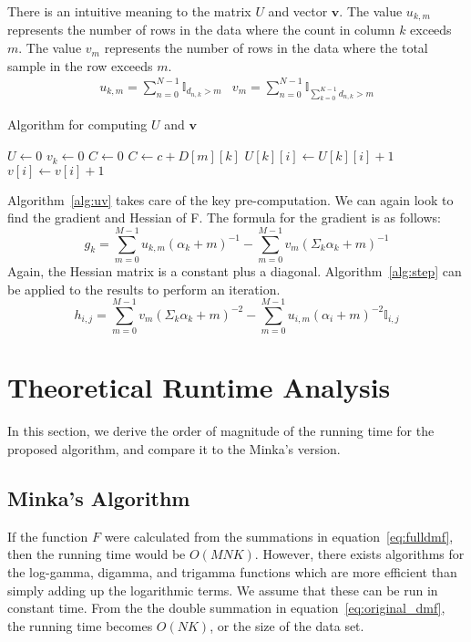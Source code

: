 \documentclass[twoside]{article}
\begin{document}
There is an intuitive meaning to the matrix $U$ and vector $\mathbf{v}$.  The value $u_{k,m}$ represents the number of rows in the data where the count in column $k$ exceeds $m$.  The value $v_m$ represents the number of rows in the data where the total sample in the row exceeds $m$.  
\[
\begin{array}{cc} u_{k,m}=\sum_{n=0}^{N-1}\mathbb{I}_{d_{n,k} > m} & v_m=\sum_{n=0}^{N-1}\mathbb{I}_{\sum_{k=0}^{K-1}d_{n,k} > m}
\end{array}
\]
\begin{algorithm}
  \caption{Algorithm for computing $U$ and $\mathbf{v}$}
  \begin{algorithmic}
  \State $U \leftarrow 0$
    \State $v_k \leftarrow 0$ \EndFor
    \State $C \leftarrow 0$
      \State $C \leftarrow c + D[m][k]$      
        \State $U[k][i] \leftarrow U[k][i] + 1$      
      \EndFor
    \EndFor
      \State $v[i] \leftarrow v[i] + 1$      
    \EndFor
  \EndFor
  \end{algorithmic}
  \label{alg:uv}
\end{algorithm}
Algorithm~\ref{alg:uv} takes care of the key pre-computation. We can again look to find the gradient and Hessian of F.  The formula for the gradient is as follows:
\begin{equation}
g_k= \sum_{m=0}^{M-1}u_{k,m}(\alpha_k+m)^{-1}-
\sum_{m=0}^{M-1}v_m(\Sigma_k\alpha_k+m)^{-1}
\end{equation}
Again, the Hessian matrix is a constant plus a diagonal.  Algorithm~\ref{alg:step} can be applied to the results to perform an iteration.
\begin{equation}
h_{i,j}=\sum_{m=0}^{M-1}v_m(\Sigma_k\alpha_k+m)^{-2}-
\sum_{m=0}^{M-1}u_{i,m}(\alpha_i+m)^{-2}\mathbb{I}_{i,j}
\end{equation}
\section{Theoretical Runtime Analysis}
In this section, we derive the order of magnitude of the running time for the proposed algorithm, and compare it to the Minka's version.
\subsection{Minka's Algorithm}
If the function $F$ were calculated from the summations in equation~\eqref{eq:fulldmf}, then the running time would be $O(MNK)$.  However, there exists algorithms for the log-gamma, digamma, and trigamma functions which are more efficient than simply adding up the logarithmic terms\cite{wallach}. We assume that these can be run in constant time.  From the the double summation in equation~\eqref{eq:original_dmf}, the running time becomes $O(NK)$, or the size of the data set.
\end{document}
